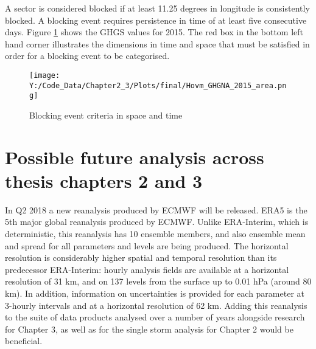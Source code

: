 A sector is considered blocked if at least 11.25 degrees in longitude is consistently blocked. A blocking event requires persistence in time of at least five consecutive days. Figure \ref{fig:block_criteria} shows the GHGS values for 2015. The red box in the bottom left hand corner illustrates the dimensions in time and space that must be satisfied in order for a blocking event to be categorised.

\begin{figure}	
	\texttt{[image: Y:/Code\_Data/Chapter2\_3/Plots/final/Hovm\_GHGNA\_2015\_area.png]}	
	\caption{Blocking event criteria in space and time}\label{fig:block_criteria}
	\centering
\end{figure}






\section{Possible future analysis across thesis chapters 2 and 3}


In Q2 2018 a new reanalysis produced by ECMWF will be released. ERA5 is the 5th major global reanalysis produced by ECMWF. Unlike ERA-Interim, which is deterministic, this reanalysis has 10 ensemble members, and also ensemble mean and spread for all parameters and levels are being produced. The horizontal resolution is considerably higher spatial and temporal resolution than its predecessor ERA-Interim: hourly analysis fields are available at a horizontal resolution of 31 km, and on 137 levels from the surface up to 0.01 hPa (around 80 km). In addition, information on uncertainties is provided for each parameter at 3-hourly intervals and at a horizontal resolution of 62 km.
Adding this reanalysis to the suite of data products analysed over a number of years alongside research for Chapter 3, as well as for the single storm analysis for Chapter 2 would be beneficial.





